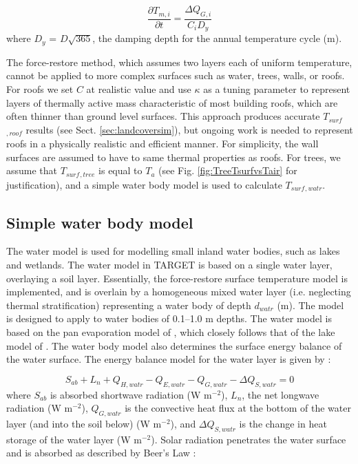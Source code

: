 \documentclass[gmd, manuscript]{copernicus}
\begin{document}
\begin{equation} 
\frac{\partial T_{m,i}}{\partial t} = \frac{\Delta \ensuremath{Q_{G,i}}}{C_{i} D_{y}}
\label{eq:tm} \end{equation} where \ensuremath{D_{y}} = $D \sqrt{365}$, the damping depth for the annual temperature cycle (m). 

The force-restore method, which assumes two layers each of uniform temperature, cannot be applied to more complex surfaces such as water, trees, walls, or roofs. For  roofs  we set \ensuremath{C} at realistic value and use \ensuremath{\kappa} as a tuning parameter to represent layers of thermally active mass characteristic of most building roofs, which are often thinner than ground level surfaces.  This approach produces accurate $T_{surf}$$_{,roof}$ results (see Sect. \ref{sec:landcoversim}), but ongoing work is needed to represent roofs in a physically realistic  and  efficient manner. For simplicity, the wall surfaces are assumed to have to same thermal properties as roofs. For trees, we assume that $T_{surf}$$_{,tree}$ is equal to \ensuremath{T_{a}} (see Fig. \ref{fig:TreeTsurfvsTair} for justification), and a simple water body model is used to calculate $T_{surf}$$_{,watr}$.


\subsection{Simple water body model}\label{sec:simplewater}

The water model is used for modelling small inland water bodies, such as lakes and wetlands. The water model in  TARGET is based on a single water layer, overlaying a soil layer. Essentially, the force-restore surface temperature model is implemented, and is overlain by a homogeneous mixed water layer (i.e. neglecting thermal stratification) representing a water body of depth \ensuremath{d_{watr}} (m). The model is designed to apply to water bodies of 0.1--1.0 m depths. The water model is based on the pan evaporation model of \cite{MolinaMartinez2006}, which closely follows that of the lake model of \cite{Jacobs1998}. The water body model also determines the surface energy balance of the water surface. The energy balance model for the water layer is given by \cite{MolinaMartinez2006}:

\begin{equation} 
\ensuremath{S_{ab}} + \ensuremath{L_{n}} + \ensuremath{Q_{H,watr}} - \ensuremath{Q_{E,watr}} - \ensuremath{Q_{G,watr}} -\ensuremath{\Delta Q_{S,watr}} = 0
\label{eq:sab} \end{equation} where \ensuremath{S_{ab}} is absorbed shortwave radiation (W m$^{-2}$), \ensuremath{L_{n}}, the net longwave radiation (W m$^{-2}$), \ensuremath{Q_{G,watr}} is the convective heat flux at the bottom of the water layer (and into the soil below) (W m$^{-2}$), and \ensuremath{\Delta Q_{S,watr}} is the change in heat storage of the water layer (W m$^{-2}$). Solar radiation penetrates the water surface and is absorbed as described by Beer's Law \citep{MolinaMartinez2006}:
\end{document}
